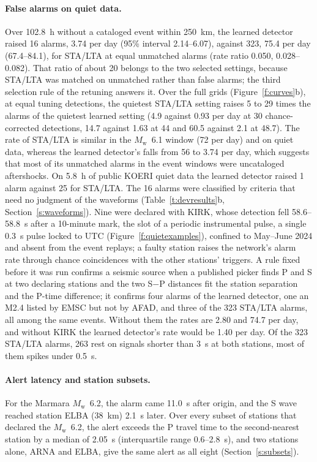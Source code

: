 \documentclass[11pt,a4paper]{article}
\newcommand{\Mw}{$M_\mathrm{w}$}
\newcommand{\stalta}{STA/LTA}
\begin{document}
\paragraph{False alarms on quiet data.} Over 102.8~h without a cataloged event within
250~km, the learned detector raised 16 alarms, 3.74 per day (95\% interval 2.14--6.07),
against 323, 75.4 per day (67.4--84.1), for \stalta{} at equal unmatched alarms (rate
ratio 0.050, 0.028--0.082). That ratio of about 20 belongs to the two selected
settings, because \stalta{} was matched on unmatched rather than false alarms; the
third selection rule of the retuning answers it. Over the full grids
(Figure~\ref{f:curves}b), at equal tuning detections, the quietest \stalta{} setting
raises 5 to 29 times the alarms of the quietest learned setting (4.9 against 0.93 per
day at 30 chance-corrected detections, 14.7 against 1.63 at 44 and 60.5 against 2.1 at
48.7). The rate of \stalta{} is similar in the \Mw{}~6.1 window (72 per day) and on
quiet data, whereas the learned detector's falls from 56 to 3.74 per day, which
suggests that most of its unmatched alarms in the event windows were uncataloged
aftershocks. On 5.8~h of public KOERI quiet data the learned detector raised 1 alarm
against 25 for \stalta{}. The 16 alarms were classified by criteria that need no
judgment of the waveforms (Table~\ref{t:devresults}b, Section~\ref{s:waveforms}). Nine
were declared with KIRK, whose detection fell 58.6--58.8~s after a 10-minute mark, the
slot of a periodic instrumental pulse, a single 0.3~s pulse locked to UTC
(Figure~\ref{f:quietexamples}), confined to May--June 2024 and absent from the event
replays; a faulty station raises the network's alarm rate through chance coincidences
with the other stations' triggers. A rule fixed before it was run confirms a seismic
source when a published picker finds P and S at two declaring stations and the two
S$-$P distances fit the station separation and the P-time difference; it confirms four
alarms of the learned detector, one an M2.4 listed by EMSC but not by AFAD, and three
of the 323 \stalta{} alarms, all among the same events. Without them the rates are 2.80
and 74.7 per day, and without KIRK the learned detector's rate would be 1.40 per day.
Of the 323 \stalta{} alarms, 263 rest on signals shorter than 3~s at both stations,
most of them spikes under 0.5~s.

\paragraph{Alert latency and station subsets.} For the Marmara \Mw{}~6.2, the alarm
came 11.0~s after origin, and the S wave reached station ELBA (38~km) 2.1~s later.
Over every subset of stations that declared the \Mw{}~6.2, the alert exceeds the P
travel time to the second-nearest station by a median of 2.05~s (interquartile range
0.6--2.8~s), and two stations alone, ARNA and ELBA, give the same alert as all eight
(Section~\ref{s:subsets}).
\end{document}

